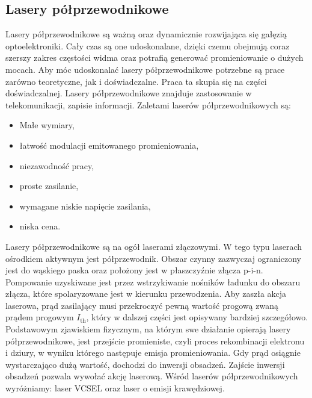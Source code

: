 \subsection{Lasery półprzewodnikowe}
Lasery półprzewodnikowe są ważną oraz dynamicznie rozwijająca się gałęzią optoelektroniki. Cały czas są one udoskonalane,
dzięki czemu obejmują coraz szerszy zakres częstości widma oraz potrafią generować promieniowanie o dużych mocach.
Aby móc udoskonalać lasery półprzewodnikowe potrzebne są prace zarówno teoretyczne, jak i doświadczalne. Praca ta skupia się na części doświadczalnej.
Lasery półprzewodnikowe znajduje zastosowanie w telekomunikacji, zapisie informacji.
Zaletami laserów półprzewodnikowych są:
\begin{itemize}
\item Małe wymiary,
\item łatwość modulacji emitowanego promieniowania,
\item niezawodność pracy,
\item proste zasilanie,
\item wymagane niskie napięcie zasilania,
\item niska cena.
\end{itemize}
\newpage
Lasery półprzewodnikowe są na ogół laserami złączowymi. W tego typu laserach ośrodkiem aktywnym jest półprzewodnik.
Obszar czynny zazwyczaj ograniczony jest do wąskiego paska oraz położony jest w płaszczyźnie złącza p-i-n.
Pompowanie uzyskiwane jest przez wstrzykiwanie nośników ładunku do obszaru złącza, które spolaryzowane jest w kierunku przewodzenia.
Aby zaszła akcja laserowa, prąd zasilający musi przekroczyć pewną wartość progową zwaną prądem progowym $I_{\mathrm{th}}$, który w dalszej części jest
opisywany bardziej szczegółowo.
Podstawowym zjawiskiem fizycznym, na którym swe działanie opierają lasery półprzewodnikowe, jest przejście promieniste,
czyli proces rekombinacji elektronu i dziury, w wyniku którego następuje emisja promieniowania. Gdy prąd osiągnie wystarczająco
dużą wartość, dochodzi do inwersji obsadzeń.
Zajście inwersji obsadzeń pozwala wywołać akcję laserową. Wśród laserów półprzewodnikowych wyróżniamy: laser VCSEL oraz laser o emisji krawędziowej.
 \newpage
